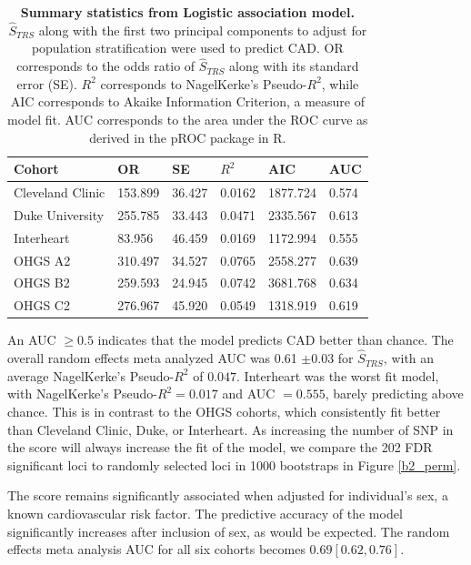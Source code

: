 \begin{table}[H]
\centering

\begin{tabular}{llllll}
\hline
Cohort           & OR        & SE       & $R^2$      & AIC      & AUC       \\ \hline
Cleveland Clinic & 153.899 & 36.427 & 0.0162 & 1877.724 & 0.574 \\
Duke University  & 255.785 & 33.443 & 0.0471 & 2335.567 & 0.613 \\
Interheart       & 83.956  & 46.459 & 0.0169 & 1172.994 & 0.555 \\
OHGS A2          & 310.497 & 34.527 & 0.0765 & 2558.277 & 0.639 \\
OHGS B2          & 259.593 & 24.945 & 0.0742 & 3681.768 & 0.634 \\
OHGS C2          & 276.967 & 45.920 & 0.0549 & 1318.919 & 0.619 \\ \hline
\end{tabular}
\caption[Summary statistics from Logistic association model for $\hat{S}_{TRS}$.]{\textbf{Summary statistics from Logistic association model.} $\hat{S}_{TRS}$ along with the first two principal components to adjust for population stratification were used to predict \ac{CAD}. OR corresponds to the odds ratio of $\hat{S}_{TRS}$ along with its standard error (SE). $R^2$ corresponds to NagelKerke's Pseudo-$R^2$, while AIC corresponds to Akaike Information Criterion, a measure of model fit. AUC corresponds to the area under the \ac{ROC} curve as derived in the pROC package in R.}
\label{trs}
\end{table}

An \ac{AUC} $\geq 0.5$ indicates that the model predicts CAD better than chance. The overall random effects meta analyzed \ac{AUC} was 0.61 $\pm 0.03$ for $\hat{S}_{TRS}$, with an average NagelKerke's Pseudo-$R^2$ of $0.047$. Interheart was the worst fit model, with NagelKerke's Pseudo-$R^2 = 0.017$ and \ac{AUC} $= 0.555$, barely predicting above chance. This is in contrast to the OHGS cohorts, which consistently fit better than Cleveland Clinic, Duke, or Interheart. As increasing the number of \acs{SNP} in the score will always increase the fit of the model, we compare the 202 FDR significant loci to randomly selected loci in 1000 bootstraps in Figure \ref{b2_perm}. 

The score remains significantly associated when adjusted for individual's sex, a known cardiovascular risk factor. The predictive accuracy of the model significantly increases after inclusion of sex, as would be expected. The random effects meta analysis \ac{AUC} for all six cohorts becomes $0.69[0.62, 0.76]$. 

